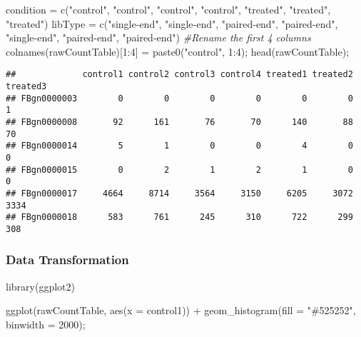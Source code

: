 \documentclass[
]{article}
\newenvironment{Shaded}{\begin{snugshade}}{\end{snugshade}}
\newcommand{\AttributeTok}[1]{\textcolor[rgb]{0.77,0.63,0.00}{#1}}
\newcommand{\CommentTok}[1]{\textcolor[rgb]{0.56,0.35,0.01}{\textit{#1}}}
\newcommand{\DecValTok}[1]{\textcolor[rgb]{0.00,0.00,0.81}{#1}}
\newcommand{\FunctionTok}[1]{\textcolor[rgb]{0.00,0.00,0.00}{#1}}
\newcommand{\NormalTok}[1]{#1}
\newcommand{\OtherTok}[1]{\textcolor[rgb]{0.56,0.35,0.01}{#1}}
\newcommand{\SpecialCharTok}[1]{\textcolor[rgb]{0.00,0.00,0.00}{#1}}
\newcommand{\StringTok}[1]{\textcolor[rgb]{0.31,0.60,0.02}{#1}}
\begin{document}
\begin{Shaded}
\begin{Highlighting}[]
\NormalTok{condition }\OtherTok{=} \FunctionTok{c}\NormalTok{(}\StringTok{"control"}\NormalTok{, }\StringTok{"control"}\NormalTok{, }\StringTok{"control"}\NormalTok{, }\StringTok{"control"}\NormalTok{, }\StringTok{"treated"}\NormalTok{, }\StringTok{"treated"}\NormalTok{, }\StringTok{"treated"}\NormalTok{)}
\NormalTok{libType }\OtherTok{=} \FunctionTok{c}\NormalTok{(}\StringTok{"single{-}end"}\NormalTok{, }\StringTok{"single{-}end"}\NormalTok{, }\StringTok{"paired{-}end"}\NormalTok{, }\StringTok{"paired{-}end"}\NormalTok{, }\StringTok{"single{-}end"}\NormalTok{,}
\StringTok{"paired{-}end"}\NormalTok{, }\StringTok{"paired{-}end"}\NormalTok{)}
\CommentTok{\#Rename the first 4 columns}
\FunctionTok{colnames}\NormalTok{(rawCountTable)[}\DecValTok{1}\SpecialCharTok{:}\DecValTok{4}\NormalTok{] }\OtherTok{=} \FunctionTok{paste0}\NormalTok{(}\StringTok{"control"}\NormalTok{, }\DecValTok{1}\SpecialCharTok{:}\DecValTok{4}\NormalTok{);}
\FunctionTok{head}\NormalTok{(rawCountTable);}
\end{Highlighting}
\end{Shaded}

\begin{verbatim}
##             control1 control2 control3 control4 treated1 treated2 treated3
## FBgn0000003        0        0        0        0        0        0        1
## FBgn0000008       92      161       76       70      140       88       70
## FBgn0000014        5        1        0        0        4        0        0
## FBgn0000015        0        2        1        2        1        0        0
## FBgn0000017     4664     8714     3564     3150     6205     3072     3334
## FBgn0000018      583      761      245      310      722      299      308
\end{verbatim}

\hypertarget{data-transformation}{%
\subsubsection{Data Transformation}\label{data-transformation}}

\begin{Shaded}
\begin{Highlighting}[]
\FunctionTok{library}\NormalTok{(ggplot2)}

\FunctionTok{ggplot}\NormalTok{(rawCountTable, }\FunctionTok{aes}\NormalTok{(}\AttributeTok{x =}\NormalTok{ control1)) }\SpecialCharTok{+} \FunctionTok{geom\_histogram}\NormalTok{(}\AttributeTok{fill =} \StringTok{"\#525252"}\NormalTok{, }\AttributeTok{binwidth =} \DecValTok{2000}\NormalTok{);}
\end{Highlighting}
\end{Shaded}
\end{document}
